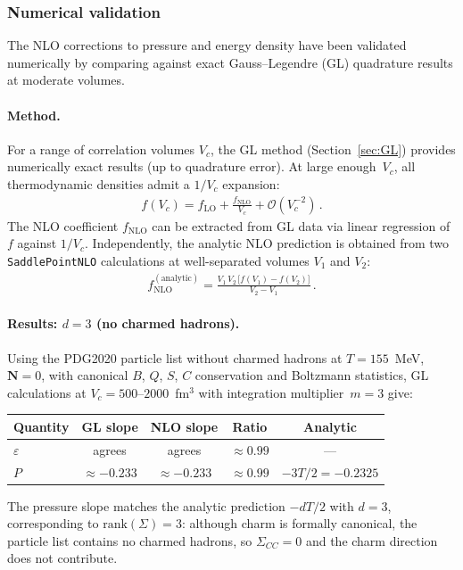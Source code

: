 \documentclass[11pt]{article}
\newcommand{\bN}{\mathbf{N}}
\newcommand{\LO}{\mathrm{LO}}
\newcommand{\NLO}{\mathrm{NLO}}
\begin{document}
\subsubsection{Numerical validation}
\label{sec:nlo_validation}

The NLO corrections to pressure and energy density have been validated numerically by comparing against exact Gauss--Legendre (GL) quadrature results at moderate volumes.

\paragraph{Method.}
For a range of correlation volumes $V_c$, the GL method (Section~\ref{sec:GL}) provides numerically exact results (up to quadrature error).
At large enough~$V_c$, all thermodynamic densities admit a $1/V_c$ expansion:
\begin{align}
  f(V_c) = f_\LO + \frac{f_{\NLO}}{V_c} + \mathcal{O}(V_c^{-2}) \,.
\end{align}
The NLO coefficient $f_{\NLO}$ can be extracted from GL data via linear regression of~$f$ against $1/V_c$.
Independently, the analytic NLO prediction is obtained from two \texttt{SaddlePointNLO} calculations at well-separated volumes $V_1$ and $V_2$:
\begin{align}
  f_\NLO^\mathrm{(analytic)} = \frac{V_1\,V_2\,\big[f(V_1) - f(V_2)\big]}{V_2 - V_1} \,.
\end{align}

\paragraph{Results: $d = 3$ (no charmed hadrons).}
Using the PDG2020 particle list without charmed hadrons at $T = 155$~MeV, $\bN = 0$, with canonical $B$, $Q$, $S$, $C$ conservation and Boltzmann statistics, GL calculations at $V_c = 500$--$2000$~fm$^3$ with integration multiplier~$m = 3$ give:
\begin{center}
\begin{tabular}{@{}lcccc@{}}
\toprule
Quantity & GL slope & NLO slope & Ratio & Analytic \\
\midrule
$\varepsilon$ & agrees & agrees & $\approx 0.99$ & --- \\
$P$           & $\approx -0.233$ & $\approx -0.233$ & $\approx 0.99$ & $-3T/2 = -0.2325$ \\
\bottomrule
\end{tabular}
\end{center}
The pressure slope matches the analytic prediction $-dT/2$ with $d = 3$, corresponding to $\mathrm{rank}(\Sigma) = 3$: although charm is formally canonical, the particle list contains no charmed hadrons, so $\Sigma_{CC} = 0$ and the charm direction does not contribute.
\end{document}
